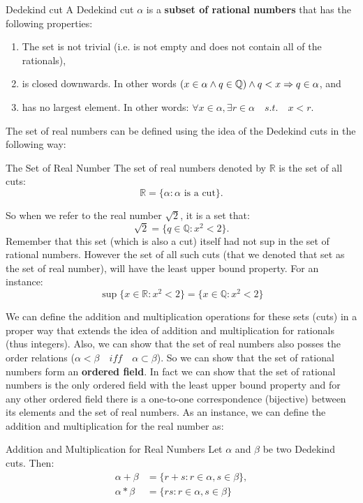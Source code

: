 \begin{defbox}{Dedekind cut}
	A Dedekind cut $\alpha$ is a \textbf{subset of rational numbers} that has the following properties:
	\begin{enumerate}
		\item The set is not trivial (i.e. is not empty and does not contain all of the rationals),
		\item is closed downwards. In other words $(x \in \alpha \wedge q \in \mathbb{Q}) \wedge q < x \Rightarrow q \in \alpha$, and 
		\item has no largest element. In other words: $\forall x \in \alpha, \exists r \in \alpha \quad s.t. \quad x<r$.
	\end{enumerate} 
\end{defbox}

The set of real numbers can be defined using the idea of the Dedekind cuts in the following way:

\begin{defbox}{The Set of Real Number}
	The set of real numbers denoted by $\mathbb{R}$ is the set of all cuts:
	\[ \mathbb{R} = \{ \alpha: \alpha \text{ is a cut} \}. \]
\end{defbox}

So when we refer to the real number $\sqrt{2}$, it is a set that:
\[ \sqrt{2} = \{ q \in \mathbb{Q} : x^2 < 2 \}. \]
Remember that this set (which is also a cut) itself had not sup in the set of rational numbers. However the set of all such cuts (that we denoted that set as the set of real number), will have the least upper bound property. For an instance:
\[ \sup \{ x \in \mathbb{R} : x^2 < 2 \} = \{ x \in \mathbb{Q} : x^2 < 2 \} \]

We can define the addition and multiplication operations for these sets (cuts) in a proper way that extends the idea of addition and multiplication for rationals (thus integers). Also, we can show that the set of real numbers also posses the order relations ($\alpha < \beta \quad iff \quad \alpha \subset \beta$). So we can show that the set of rational numbers form an \textbf{ordered field}. In fact we can show that the set of rational numbers is the only ordered field with the least upper bound property and for any other ordered field there is a one-to-one correspondence (bijective) between its elements and the set of real numbers. As an instance, we can define the addition and multiplication for the real number as:
\begin{defbox}{Addition and Multiplication for Real Numbers}
	Let $\alpha$ and $\beta$ be two Dedekind cuts. Then:
	\begin{align*}
		\alpha + \beta &= \{ r+s : r \in \alpha, s \in \beta \}, \\
		\alpha * \beta &= \{ rs  : r \in \alpha, s \in \beta \}
	\end{align*}
\end{defbox} 

